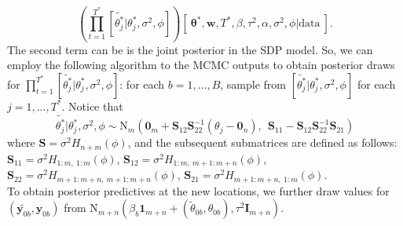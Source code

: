 \documentclass[11pt]{article}
\newcommand{\m}[1]{\mathbf{\bm{#1}}} %
\begin{document}
\[
  \left(\prod_{t=1}^{T^*}[\tilde{\theta_j^*}| \theta_j^*,\sigma^2,\phi]\right)
  [~\m\theta^*,\m w, T^*,\beta,\tau^2,\alpha,\sigma^2,\phi|\text{data}~].
\]
The second term can be is the joint posterior in the SDP model. So, we can employ 
the following algorithm to the MCMC outputs to obtain posterior draws for 
$\prod_{t=1}^{T^*}[\tilde{\theta_j^*}| \theta_j^*,\sigma^2,\phi]$: 
for each $b = 1,...,B$, sample from $[\tilde{\theta_j^*}| \theta_j^*,\sigma^2,\phi]$
for each $j = 1,...,T^*$. Notice that 
\[
  \tilde{\theta_j^*}|\theta_j^*,\sigma^2,\phi \sim \text{N}_m(\m 0_m+\m S_{12}\m S_{22}^{-1}(\theta_j-\m 0_n),
  ~~\m S_{11} - \m S_{12} \m S_{22}^{-1} \m S_{21})
\]
where $\m S = \sigma^2 H_{n+m}(\phi)$, and the subsequent submatrices are defined as follows:
$\m S_{11} = \sigma^2 H_{1:m,~1:m}(\phi)$,
$\m S_{12} = \sigma^2 H_{1:m,~m+1:m+n}(\phi)$,
$\m S_{22} = \sigma^2 H_{m+1:m+n,~m+1:m+n}(\phi)$,
$\m S_{21} = \sigma^2 H_{m+1:m+n,~1:m}(\phi)$.\\
To obtain posterior predictives at the new locations, we further draw values for 
$(\tilde{\m y_{0b}},\m y_{0b})$ from $\text{N}_{m+n}(\beta_b\m 1_{m+n}+(\tilde\theta_{0b},\theta_{0b}),\tau^2\m I_{m+n})$.
\end{document}
